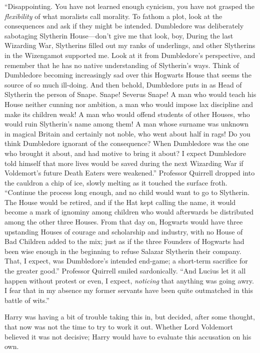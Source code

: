 “Disappointing. You have not learned enough cynicism, you have not grasped the \emph{flexibility} of what moralists call morality. To fathom a plot, look at the consequences and ask if they might be intended. Dumbledore was deliberately sabotaging Slytherin House—don’t give me that look, boy,  During the last Wizarding War, Slytherins filled out my ranks of underlings, and other Slytherins in the Wizengamot supported me. Look at it from Dumbledore’s perspective, and remember that he has no native understanding of Slytherin’s ways. Think of Dumbledore becoming increasingly sad over this Hogwarts House that seems the source of so much ill-doing. And then behold, Dumbledore puts in as Head of Slytherin the person of Snape. Snape! Severus Snape! A man who would teach his House neither cunning nor ambition, a man who would impose lax discipline and make its children weak! A man who would offend students of other Houses, who would ruin Slytherin’s name among them! A man whose surname was unknown in magical Britain and certainly not noble, who went about half in rags! Do you think Dumbledore ignorant of the consequence? When Dumbledore was the one who brought it about, and had motive to bring it about? I expect Dumbledore told himself that more lives would be saved during the next Wizarding War if Voldemort’s future Death Eaters were weakened.” Professor Quirrell dropped into the cauldron a chip of ice, slowly melting as it touched the surface froth. “Continue the process long enough, and no child would want to go to Slytherin. The House would be retired, and if the Hat kept calling the name, it would become a mark of ignominy among children who would afterwards be distributed among the other three Houses. From that day on, Hogwarts would have three upstanding Houses of courage and scholarship and industry, with no House of Bad Children added to the mix; just as if the three Founders of Hogwarts had been wise enough in the beginning to refuse Salazar Slytherin their company. That, I expect, was Dumbledore’s intended end-game; a short-term sacrifice for the greater good.” Professor Quirrell smiled sardonically. “And Lucius let it all happen without protest or even, I expect, \emph{noticing} that anything was going awry. I fear that in my absence my former servants have been quite outmatched in this battle of wits.”

Harry was having a bit of trouble taking this in, but decided, after some thought, that now was not the time to try to work it out. Whether Lord Voldemort believed it was not decisive; Harry would have to evaluate this accusation on his own.

